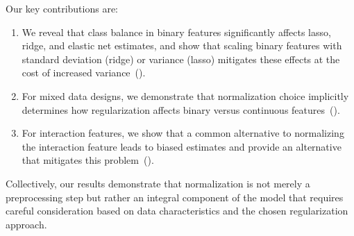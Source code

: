 Our key contributions are:
\begin{enumerate}
  \item We reveal that class balance in binary features significantly affects lasso, ridge, and
        elastic net estimates, and show that scaling binary features with standard deviation
        (ridge) or variance (lasso) mitigates these effects at the cost of increased
        variance~().
  \item For mixed data designs, we demonstrate that normalization choice implicitly determines how
        regularization affects binary versus continuous features~().
  \item For interaction features, we show that a common alternative to normalizing the interaction
        feature leads to biased estimates and provide an alternative that mitigates this
        problem~().
\end{enumerate}

Collectively, our results demonstrate that normalization is not merely a preprocessing step
but rather an integral component of the model that requires careful consideration based on
data characteristics and the chosen regularization approach.
